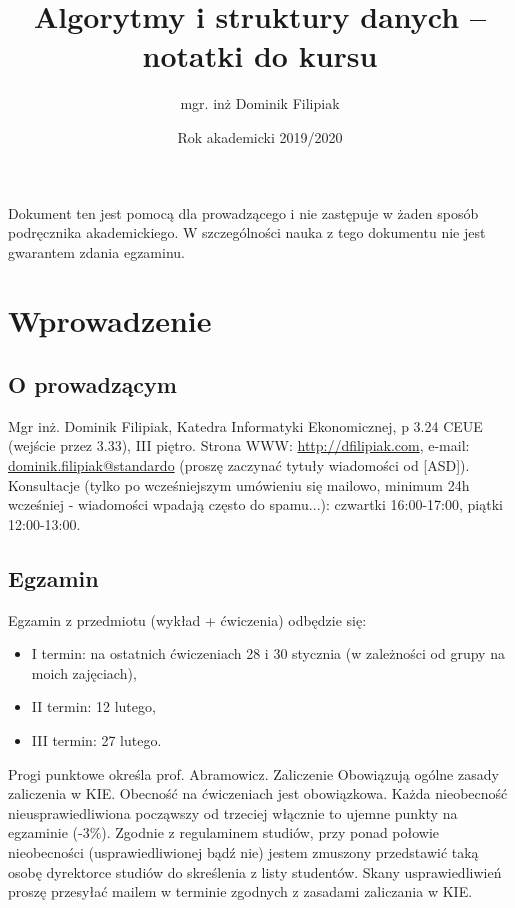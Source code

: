 \documentclass[10pt, oneside]{article}
\title{Algorytmy i struktury danych -- notatki do kursu}
\author{mgr. inż Dominik Filipiak}
\date{Rok akademicki 2019/2020}
\theoremstyle{remark}
\begin{document}
\maketitle
\tableofcontents

\vspace{.25in}

Dokument ten jest pomocą dla prowadzącego i nie zastępuje w żaden sposób podręcznika akademickiego.
W szczególności nauka z tego dokumentu nie jest gwarantem zdania egzaminu.

\section{Wprowadzenie}

\subsection{O prowadzącym}
Mgr inż. Dominik Filipiak, Katedra Informatyki Ekonomicznej, p 3.24 CEUE (wejście przez 3.33), III piętro.
Strona WWW: \url{http://dfilipiak.com}, e-mail: \url{dominik.filipiak@standardo} (proszę zaczynać tytuły wiadomości od [ASD]).
Konsultacje (tylko po wcześniejszym umówieniu się mailowo, minimum 24h wcześniej - wiadomości wpadają często do spamu...): czwartki 16:00-17:00, piątki 12:00-13:00.

\subsection{Egzamin}
Egzamin z przedmiotu (wykład + ćwiczenia) odbędzie się:
\begin{itemize}
	\item I termin: na ostatnich ćwiczeniach 28 i 30 stycznia (w zależności od grupy na moich zajęciach),
	\item II termin: 12 lutego,
	\item III termin: 27 lutego.
\end{itemize}
Progi punktowe określa prof. Abramowicz.
Zaliczenie
Obowiązują ogólne zasady zaliczenia w KIE. Obecność na ćwiczeniach jest obowiązkowa. Każda nieobecność nieusprawiedliwiona począwszy od trzeciej włącznie to ujemne punkty na egzaminie (-3\%).
Zgodnie z regulaminem studiów, przy ponad połowie nieobecności (usprawiedliwionej bądź nie) jestem zmuszony przedstawić taką osobę dyrektorce studiów do skreślenia z listy studentów. Skany usprawiedliwień proszę przesyłać mailem w terminie zgodnych z zasadami zaliczania w KIE.
\end{document}
